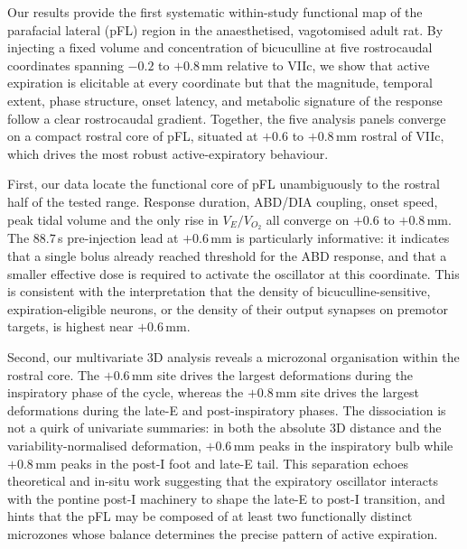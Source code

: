 \documentclass[11pt]{article}
\begin{document}
Our results provide the first systematic within-study functional map of
the parafacial lateral (pFL) region in the anaesthetised, vagotomised
adult rat. By injecting a fixed volume and concentration of bicuculline
at five rostrocaudal coordinates spanning $-0.2$ to $+0.8$\,mm relative
to VIIc, we show that active expiration is elicitable at every
coordinate but that the magnitude, temporal extent, phase structure,
onset latency, and metabolic signature of the response follow a clear
rostrocaudal gradient. Together, the five analysis panels converge on a
compact rostral core of pFL, situated at $+0.6$ to $+0.8$\,mm rostral of
VIIc, which drives the most robust active-expiratory behaviour.

First, our data locate the functional core of pFL unambiguously to the
rostral half of the tested range. Response duration, ABD/DIA coupling,
onset speed, peak tidal volume and the only rise in $V_E/V_{O_2}$ all
converge on $+0.6$ to $+0.8$\,mm. The $88.7$\,s pre-injection lead at
$+0.6$\,mm is particularly informative: it indicates that a single bolus
already reached threshold for the ABD response, and that a smaller
effective dose is required to activate the oscillator at this coordinate.
This is consistent with the interpretation that the density of
bicuculline-sensitive, expiration-eligible neurons, or the density of
their output synapses on premotor targets, is highest near $+0.6$\,mm.

Second, our multivariate 3D analysis reveals a microzonal organisation
within the rostral core. The $+0.6$\,mm site drives the largest
deformations during the inspiratory phase of the cycle, whereas the
$+0.8$\,mm site drives the largest deformations during the late-E and
post-inspiratory phases. The dissociation is not a quirk of univariate
summaries: in both the absolute 3D distance and the
variability-normalised deformation, $+0.6$\,mm peaks in the inspiratory
bulb while $+0.8$\,mm peaks in the post-I foot and late-E tail. This
separation echoes theoretical
\citep{Molkov2010Computational,Barnett2017Partial} and in-situ
\citep{Abdala2009Abdominal,Dhingra2020LateE} work suggesting that the
expiratory oscillator interacts with the pontine post-I machinery
\citep{Dutschmann2006Pontine} to shape the late-E to post-I transition,
and hints that the pFL may be composed of at least two functionally
distinct microzones whose balance determines the precise pattern of
active expiration.
\end{document}

